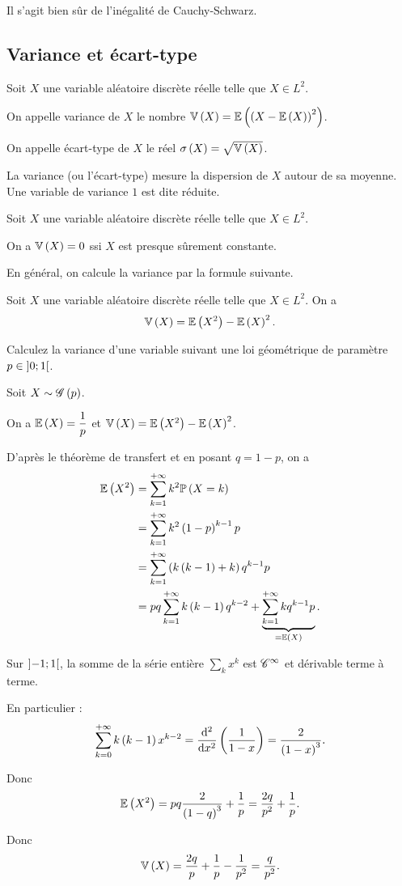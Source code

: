 Il s'agit bien sûr de l'inégalité de Cauchy-Schwarz.

\subsection{Variance et écart-type}

\begin{defi}
Soit \(X\) une variable aléatoire discrète réelle telle que \(X\in L^2\).

On appelle variance de \(X\) le nombre \(\operatorname{\mathbb{V}}\left(X\right)=\operatorname{\mathbb{E}}\left(\left(X-\operatorname{\mathbb{E}}\left(X\right)\right)^2\right)\).

On appelle écart-type de \(X\) le réel \(\sigma\left(X\right)=\sqrt{\operatorname{\mathbb{V}}\left(X\right)}\).
\end{defi}

La variance (ou l'écart-type) mesure la dispersion de \(X\) autour de sa moyenne. Une variable de variance \(1\) est dite réduite.

\begin{prop}
Soit \(X\) une variable aléatoire discrète réelle telle que \(X\in L^2\).

On a \(\operatorname{\mathbb{V}}\left(X\right)=0\) ssi \(X\) est presque sûrement constante.
\end{prop}

En général, on calcule la variance par la formule suivante.

\begin{prop}
Soit \(X\) une variable aléatoire discrète réelle telle que \(X\in L^2\). On a \[\operatorname{\mathbb{V}}\left(X\right)=\operatorname{\mathbb{E}}\left(X^2\right)-\operatorname{\mathbb{E}}\left(X\right)^2.\]
\end{prop}

\begin{exo}
Calculez la variance d'une variable suivant une loi géométrique de paramètre \(p\in\left]0;1\right[\).
\end{exo}

\begin{corr}
Soit \(X\sim\mathscr{G}\left(p\right)\).

On a \(\operatorname{\mathbb{E}}\left(X\right)=\dfrac{1}{p}\) et \(\operatorname{\mathbb{V}}\left(X\right)=\operatorname{\mathbb{E}}\left(X^2\right)-\operatorname{\mathbb{E}}\left(X\right)^2\).

D'après le théorème de transfert et en posant \(q=1-p\), on a \[\begin{aligned}
\operatorname{\mathbb{E}}\left(X^2\right)&=\sum_{k=1}^{+\infty}k^2\mathbb{P}\left(X=k\right) \\
&=\sum_{k=1}^{+\infty}k^2\left(1-p\right)^{k-1}p \\
&=\sum_{k=1}^{+\infty}\left(k\left(k-1\right)+k\right)q^{k-1}p \\
&=pq\sum_{k=1}^{+\infty}k\left(k-1\right)q^{k-2}+\underbrace{\sum_{k=1}^{+\infty}kq^{k-1}p}_{=\operatorname{\mathbb{E}}\left(X\right)}.
\end{aligned}\]

Sur \(\left]-1;1\right[\), la somme de la série entière \(\sum_kx^k\) est \(\mathscr{C}^{\infty}\) et dérivable terme à terme.

En particulier : \[\sum_{k=0}^{\pinf}k\paren{k-1}x^{k-2}=\odv*[order=2]{\paren{\dfrac{1}{1-x}}}{x}=\dfrac{2}{\paren{1-x}^3}.\]

Donc \[\operatorname{\mathbb{E}}\left(X^2\right)=pq\dfrac{2}{\left(1-q\right)^3}+\dfrac{1}{p}=\dfrac{2q}{p^2}+\dfrac{1}{p}.\]

Donc \[\operatorname{\mathbb{V}}\left(X\right)=\dfrac{2q}{p}+\dfrac{1}{p}-\dfrac{1}{p^2}=\dfrac{q}{p^2}.\]
\end{corr}

